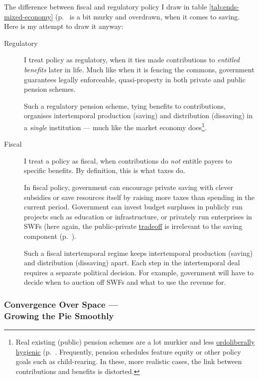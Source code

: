 The difference between fiscal and regulatory policy I draw in table \ref{tab:ends-mixed-economy} (p.~\pageref{tab:ends-mixed-economy} is a bit murky and overdrawn, when it comes to saving.  Here is my attempt to draw it anyway: 
\begin{description}
	\item[Regulatory] I treat policy as regulatory, when it ties made contributions to \emph{entitled benefits} later in life. Much like when it is fencing the commons, government guarantees legally enforceable, quasi-property in both private and public pension schemes. 
	
	Such a regulatory pension scheme, tying benefits to contributions, organises intertemporal production (saving) and distribution (dissaving) in a \emph{single} institution --- much like the market economy does\footnote{
		Real existing (public) pension schemes are a lot murkier and less \hyperref[sec:ordoliberalhygiene]{ordoliberally hygienic} (p.~\pageref{sec:ordoliberalhygiene}. Frequently, pension schedules feature equity or other policy goals such as child-rearing. In these, more realistic cases, the link between contributions and benefits is distorted.}.
	\item[Fiscal] I treat a policy as fiscal, when contributions do \emph{not} entitle payers to specific benefits. By definition, this is what taxes do.
	
	In fiscal policy, government can encourage private saving with clever subsidies or save resources itself by raising more taxes than spending in the current period. Government can invest budget surpluses in publicly run projects such as education or infrastructure, or privately run enterprises in \glspl{SWF} (here again, the public-private \hyperref[sec:tradeoffs]{tradeoff} is irrelevant to the saving component (p.~\pageref{tradeoffs}).
	
	Such a fiscal intertemporal regime keeps intertemporal production (saving) and distribution (dissaving) apart. Each step in the intertemporal deal requires a separate political decision. For example, government will have to decide when to auction off \glspl{SWF} and what to use the revenue for.
\end{description}

\subsubsection[Convergence Over Space]{Convergence Over Space ---\\Growing the Pie Smoothly} \label{sec:space}

